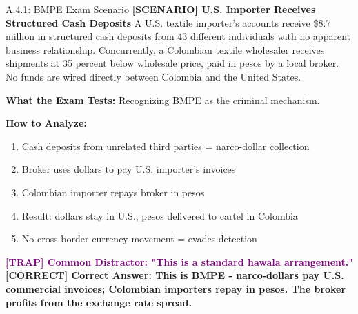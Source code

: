 \documentclass[11pt,a4paper]{beamer}
\newcommand{\trap}[1]{\textcolor{purple}{\textbf{[TRAP] #1}}}
\newcommand{\correct}[1]{\textcolor{green!50!black}{\textbf{[CORRECT] #1}}}
\newcommand{\scenario}[1]{\textcolor{blue!70!black}{\textbf{[SCENARIO] #1}}}
\begin{document}
	\begin{frame}{A.4.1: BMPE Exam Scenario}
		\scenario{U.S. Importer Receives Structured Cash Deposits}
		A U.S. textile importer's accounts receive \$8.7 million in structured cash deposits from 43 different individuals with no apparent business relationship. Concurrently, a Colombian textile wholesaler receives shipments at 35 percent below wholesale price, paid in pesos by a local broker. No funds are wired directly between Colombia and the United States.
		
		\vspace{0.1cm}
		\textbf{What the Exam Tests:} Recognizing BMPE as the criminal mechanism.
		
		\vspace{0.1cm}
		\textbf{How to Analyze:}
		\begin{enumerate}
			\item Cash deposits from unrelated third parties = narco-dollar collection
			\item Broker uses dollars to pay U.S. importer's invoices
			\item Colombian importer repays broker in pesos
			\item Result: dollars stay in U.S., pesos delivered to cartel in Colombia
			\item No cross-border currency movement = evades detection
		\end{enumerate}
		
		\trap{Common Distractor: "This is a standard hawala arrangement."}
		\correct{Correct Answer: This is BMPE - narco-dollars pay U.S. commercial invoices; Colombian importers repay in pesos. The broker profits from the exchange rate spread.}
	\end{frame}
	
	
\end{document}
